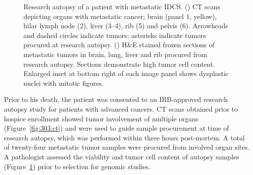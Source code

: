 \begin{figure}[htbp]
\begin{subfigure}{0.235\textwidth}
		\caption{}\label{fig:303:histo}
	\end{subfigure}
	\caption[Research autopsy of a patient with metastatic IDCS.]{Research autopsy of a patient with metastatic IDCS. () CT scans depicting organs with metastatic cancer; brain (panel 1, yellow), hilar lymph node (2), liver (3--4), rib (5) and pelvis (6). Arrowheads and dashed circles indicate tumors; asterisks indicate tumors procured at research autopsy. () H\&E stained frozen sections of metastatic tumors in brain, lung, liver and rib procured from research autopsy. Sections demonstrate high tumor cell content. Enlarged inset at bottom right of each image panel shows dysplastic nuclei with mitotic figures.}
	\label{fig:303:tumor_images}
\end{figure}
Prior to his death, the patient was consented to an IRB-approved research autopsy study for patients with advanced cancers. CT scans obtained prior to hospice enrollment showed tumor involvement of multiple organs (Figure~\ref{fig:303:ct}) and were used to guide sample procurement at time of research autopsy, which was performed within three hours post-mortem. A total of twenty-four metastatic tumor samples were procured from involved organ sites. A pathologist assessed the viability and tumor cell content of autopsy samples (Figure~\ref{fig:303:histo}) prior to selection for genomic studies.

